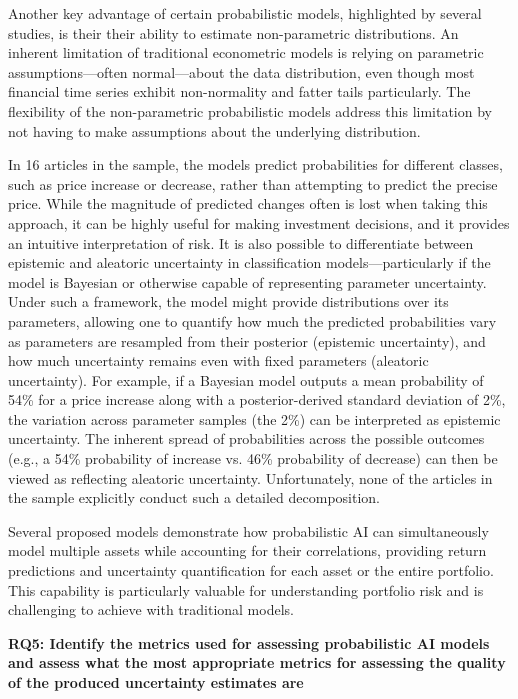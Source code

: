 Another key advantage of certain probabilistic models, highlighted by several studies, is their their ability to estimate non-parametric distributions. An inherent limitation of traditional econometric models is relying on parametric assumptions—often normal—about the data distribution, even though most financial time series exhibit non-normality and fatter tails particularly. The flexibility of the non-parametric probabilistic models address this limitation by not having to make assumptions about the underlying distribution.

In 16 articles in the sample, the models predict probabilities for different classes, such as price increase or decrease, rather than attempting to predict the precise price. While the magnitude of predicted changes often is lost when taking this approach, it can be highly useful for making investment decisions, and it provides an intuitive interpretation of risk. It is also possible to differentiate between epistemic and aleatoric uncertainty in classification models—particularly if the model is Bayesian or otherwise capable of representing parameter uncertainty. Under such a framework, the model might provide distributions over its parameters, allowing one to quantify how much the predicted probabilities vary as parameters are resampled from their posterior (epistemic uncertainty), and how much uncertainty remains even with fixed parameters (aleatoric uncertainty). For example, if a Bayesian model outputs a mean probability of 54\% for a price increase along with a posterior-derived standard deviation of 2\%, the variation across parameter samples (the 2\%) can be interpreted as epistemic uncertainty. The inherent spread of probabilities across the possible outcomes (e.g., a 54\% probability of increase vs. 46\% probability of decrease) can then be viewed as reflecting aleatoric uncertainty. Unfortunately, none of the articles in the sample explicitly conduct such a detailed decomposition.

Several proposed models demonstrate how probabilistic AI can simultaneously model multiple assets while accounting for their correlations, providing return predictions and uncertainty quantification for each asset or the entire portfolio. This capability is particularly valuable for understanding portfolio risk and is challenging to achieve with traditional models.

\textbf{RQ5: Identify the metrics used for assessing probabilistic AI models and assess what the most appropriate metrics for assessing the quality of the produced uncertainty estimates are}\nopagebreak

